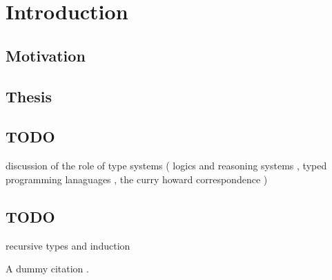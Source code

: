 \chapter{Introduction}\label{ch:intro}

\section{Motivation}

\section{Thesis}

\section{TODO}
discussion of the role of type systems
( logics and reasoning systems
, typed programming lanaguages
, the curry howard correspondence
)

\section{TODO}
recursive types and induction

A dummy citation \cite{bgb}.
